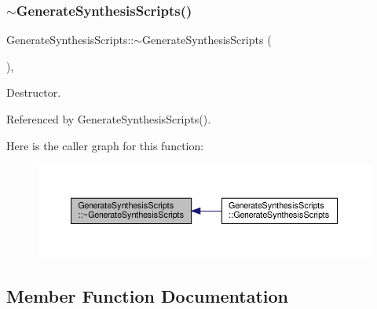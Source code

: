 \subsubsection{\texorpdfstring{$\sim$\+Generate\+Synthesis\+Scripts()}{~GenerateSynthesisScripts()}}
{\footnotesize\ttfamily Generate\+Synthesis\+Scripts\+::$\sim$\+Generate\+Synthesis\+Scripts (\begin{DoxyParamCaption}{ }\end{DoxyParamCaption})\hspace{0.3cm}{\ttfamily [override]}, {\ttfamily [default]}}



Destructor. 



Referenced by Generate\+Synthesis\+Scripts().

Here is the caller graph for this function\+:
\nopagebreak
\begin{figure}[H]
\begin{center}
\leavevmode
\includegraphics[width=350pt]{dd/dde/classGenerateSynthesisScripts_a72a2722bb7f449ac6cd5f733a3a029df_icgraph}
\end{center}
\end{figure}


\subsection{Member Function Documentation}
\mbox{\label{classGenerateSynthesisScripts_a1f8c29d2d284394856b4036bd986140a}} 

